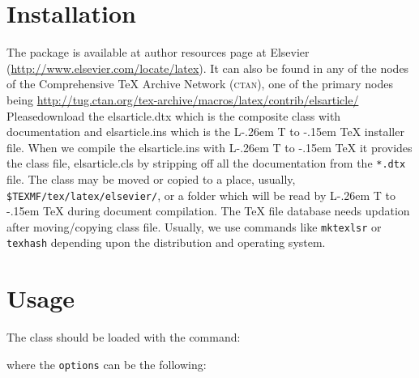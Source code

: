 \documentclass[a4paper,12pt]{article}
\makeatletter
\def\file#1{\textsf{#1}\xspace}
\DeclareRobustCommand{\LaTeX}{L\kern-.26em%
        {\sbox\z@ T%
         \vbox to\ht\z@{\hbox{\check@mathfonts
           \fontsize\sf@size\z@
           \math@fontsfalse\selectfont
          A\,}%
         \vss}%
        }%
     \kern-.15em%
    \TeX}
\makeatother
\begin{document}
\section{Installation}
\hypertarget{installation}{}

The package is available at author resources page at Elsevier 
(\url{http://www.elsevier.com/locate/latex}).
It can also be found in any of the nodes of the Comprehensive
\TeX{} Archive Network (\textsc{ctan}), one of the primary nodes
being
\url{http://tug.ctan.org/tex-archive/macros/latex/contrib/elsarticle/}
Please\linebreak download the \file{elsarticle.dtx} which is the composite
class with documentation and \file{elsarticle.ins} which is the
\LaTeX{} installer file. When we compile the
\file{elsarticle.ins} with \LaTeX{} it provides the class file,
\file{elsarticle.cls} by
stripping off all the documentation from the \verb+*.dtx+ file.
The class may be moved or copied to a place, usually,
\verb+$TEXMF/tex/latex/elsevier/+, %
or a folder which will be read
by \LaTeX{} during document compilation.  The \TeX{} file
database needs updation after moving/copying class file.  Usually,
we use commands like \verb+mktexlsr+ or \verb+texhash+ depending
upon the distribution and operating system.


\section{Usage}\label{sec:usage}
\hypertarget{usage}{}
The class should be loaded with the command:

\vspace*{4pt}

\vspace*{2pt}
\noindent where the \verb+options+ can be the following:
\end{document}

